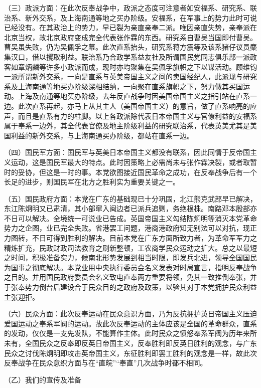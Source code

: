 （三）政派方面：在此次反奉战争中，政派之态度可注意者如安福系、研究系、联治系、新外交系，及上海南通等地之买办阶级。安福系，在军事上的势力此时可说已经没有。在其政治上的势力，早已裂为亲直亲奉二派。唯因亲直失势，亲奉派在北京当权，故北京政府变成完全代表张作霖的东西。研究系自曹吴当国即付曹吴。曹吴虽失败，仍为吴佩孚之幕。此次直系抬头，研究系蒋方震等及该系猪仔议员麋集汉口，借以攫取利益。联治系乃合政学系益友社及所谓国民党同志俱乐部一派政客如章炳麟等许多小政派而成，现时亦均聚集在吴佩孚旗帜之下以谋活动。顾维钧一派所谓新外交系，一向是直系与英美帝国主义之间的卖国经纪人，此派现与研究系及上海南通等地买办阶级深相结纳，一向聚在直系旗帜之下，努力做其买国运动。上海及南通等地买办阶级，去年反直战争时因美国帝国主义之指引站在直系一边。此次直系再起，亦马上从其主人（美国帝国主义）的意旨，做了直系响亮的应声，而且是直系有力的柱脚。以上各政派除代表日本帝国主义与官僚利益的安福系属于奉系一边外，其全代表官僚及地主阶级利益的研究联治系，代表英美尤其是美国利益的新外交系，与上海南通买办阶级，都站在直系一边。

（四）国民军方面：国民军与英美日本帝国主义都没有联系，因此同情于反帝国主义运动，这是国民军最大的特点。此时因策略上必需尚未与张作霖决裂，或者取暂时的妥协，但这是一时的事。本党欲图接近国民革命之成功，在反奉战争后有一个长足的进步，则国民军在北方之胜利实为重要关键之一。

（五）国民政府方面：本党在广东的基础现已十分巩固，北江熊克武部早已解决，东江陈炯明又已肃清，其小部窜入闽边者已派兵追剿，务绝根株。南路邓本殷部亦不日可以解决。全境统一可说业已告成。英国帝国主义勾结陈炯明等消灭本党革命势力之企图，业已完全失败。省港罢工问题，港商港政府知无别法可以对抗，现正力图转，不日可得到胜利的解决。目前本党在广东方面所致力者，为革命军军力之精炼扩充，民政财政司法教育之刷新整顿，工农商学民众运动之扩大。总之以最短之时间，积极准备实力，候南北形势发展到相当时限，即发兵北进，领导全国国民为国事之彻底解决。本党业用中央执行委员会名义发表对时局宣言，指明反奉战争之目的。并用国民政府委员会名义致电直奉两方重要将领，免其一致推倒奉张，并于张奉势力倒台后建设合于民众目的之政府及政策，以验其对于本党拥护民众利益主张迎拒。

（六）民众方面：此次反奉运动在民众意识方面，乃为反抗拥护英日帝国主义压迫爱国运动之奉系军阀的运动。故此次反奉运动的主体应该是全国的革命群众，直系的发动，仅仅是一支先发队，不能算作主体。此时民众之愤怒奉系军阀为历年来所未有，全国民众之反奉即反英日帝国主义，反奉胜利即反英日胜利的观念，与广东民众之讨伐陈炯明即攻击英帝国主义，东征胜利即罢工胜利的观念是一样，故此次反奉战争在民众意织方面与在“直皖”“奉直”几次战争时都不相同。

（乙）我们的宣传及准备

